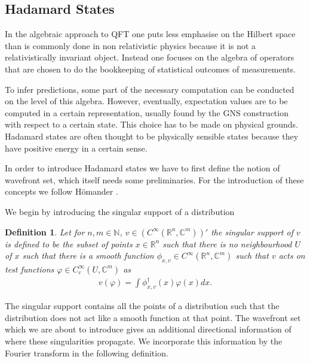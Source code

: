 \documentclass[b5paper,draft,openbib,12pt]{memoir}
\newtheorem{Def}{Definition}
\begin{document}
\subsection{Hadamard States}\label{sec:hadamard}
In the algebraic approach to QFT one puts less emphasise on the Hilbert space than is commonly done in non relativistic physics because 
it is not a relativistically invariant object.
Instead one focuses on the algebra of operators that are chosen to do the bookkeeping of statistical outcomes of measurements. 

To infer predictions, some part of the necessary computation can be conducted on the level of this algebra. However,
eventually, expectation values are to be computed in a certain representation, usually found by the GNS construction
with respect to a certain state.
This choice has to be made on physical grounds. 
Hadamard states are often thought to be physically sensible states because they have positive energy in a certain sense.

In order to introduce Hadamard states we have to first define the notion of wavefront set, which itself needs some preliminaries. 
For the introduction of these concepts we follow Hömander \cite[Chapter 8]{hormander2003analysis}.

We begin by introducing the singular support of a distribution

\begin{Def}
Let for \(n,m\in\mathbb{N}\),  \(v\in (C^\infty(\mathbb{R}^n,\mathbb{C}^m))'\) the singular support of \(v\) is defined to be the subset of points \(x\in \mathbb{R}^n\) such
that there is no neighbourhood \(U\) of \(x\) such that there is a smooth function \(\phi_{x,v}\in C^\infty (\mathbb{R}^n,\mathbb{C}^m)\) such that \(v\) acts on 
test functions \(\varphi \in C^\infty_c (U,\mathbb{C}^m)\) as
\begin{align}
v(\varphi)=\int \phi^\dagger_{x,v} (x) \varphi(x) dx.
\end{align}
\end{Def}

The singular support contains all the points of a distribution such that the distribution does not act like a smooth function at that point. The wavefront set which we are
about to introduce gives an additional directional information of where these singularities propagate. We incorporate this information by the Fourier transform 
in the following definition.
\end{document}
